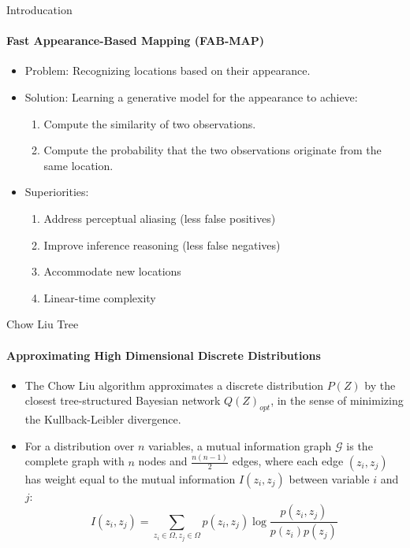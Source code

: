 \documentclass[dvipsnames, handout]{beamer}
\newcommand{\1}{\mathds{1}}	%
\begin{document}
\begin{frame}[t]{Introducation}
\framesubtitle{Fast Appearance-Based Mapping (FAB-MAP)}

\begin{itemize}
\item Problem: Recognizing locations based on their appearance.
\item Solution: Learning a generative model for the appearance to achieve:
\begin{enumerate}
\item Compute the similarity of two observations.
\item Compute the probability that the two observations originate from the same location.
\end{enumerate}
\item Superiorities: 
\begin{enumerate}
\item Address perceptual aliasing (less false positives)
\item Improve inference reasoning (less false negatives)
\item Accommodate new locations
\item Linear-time complexity
\end{enumerate}
\end{itemize}

\end{frame}


\begin{frame}[t]{Chow Liu Tree}
\framesubtitle{Approximating High Dimensional Discrete Distributions}
\begin{itemize}
\item The Chow Liu algorithm approximates a discrete distribution $P(Z)$ by the closest tree-structured Bayesian network $Q(Z)_{opt}$, in the sense of minimizing the Kullback-Leibler divergence.
\item For a distribution over $n$ variables, a mutual information graph $\mathcal{G}$ is the complete graph with $n$ nodes and $\frac{n(n-1)}{2}$ edges, where each edge $(z_i, z_j)$ has weight equal to the mutual information $I(z_i, z_j)$ between variable $i$ and $j$: 
\[I(z_i, z_j) = \sum_{z_i \in \Omega, z_j \in \Omega} p(z_i, z_j) \log \frac{p(z_i, z_j)}{p(z_i)p(z_j)}\]

\end{itemize}
\end{frame}
\end{document}
